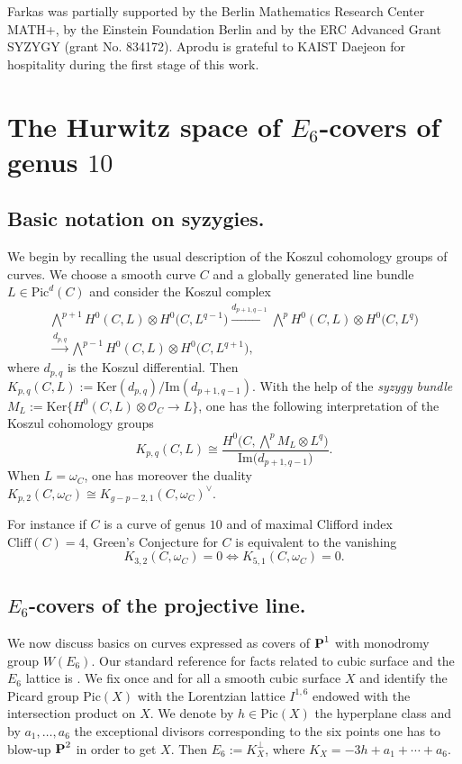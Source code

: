 \documentclass[11pt]{amsart}
\theoremstyle{definition}
\def\PP{{\textbf P}}
\begin{document}
\vskip 9pt

 Farkas was  partially supported by the Berlin Mathematics Research Center MATH+, by the Einstein Foundation Berlin and by the ERC Advanced Grant SYZYGY (grant No. 834172). Aprodu is grateful to KAIST Daejeon for hospitality during the first stage of this work.




\section{The Hurwitz space of $E_6$-covers of genus $10$}

\subsection{Basic notation on syzygies.} We begin by recalling the usual description of the Koszul cohomology groups of curves. We choose a smooth curve $C$ and a  globally generated line bundle $L\in \mbox{Pic}^d(C)$ and consider the Koszul complex
\begin{align*}
\bigwedge^{p+1} H^0(C,L)\otimes H^0\bigl(C, L^{q-1}\bigr)\stackrel{d_{p+1,q-1}}\longrightarrow \bigwedge^p H^0(C,L)\otimes H^0\bigl(C, L^q\bigr) \\
\stackrel{d_{p,q}}\longrightarrow \bigwedge^{p-1} H^0(C,L)\otimes H^0(C,  L^{q+1}\bigr),
\end{align*}
where $d_{p,q}$ is the Koszul differential. Then $K_{p,q}(C,L):=\mbox{Ker}(d_{p,q})/\mbox{Im}(d_{p+1,q-1})$. With the help of the \emph{syzygy bundle}
$M_L:=\mbox{Ker}\bigl\{H^0(C,L)\otimes \mathcal{O}_C\rightarrow L\bigr\}$,
one has the following  interpretation of the Koszul cohomology groups
\begin{equation}\label{eq:kernel_bundle}
 K_{p,q}(C, L) \cong \frac{H^0\bigl(C, \bigwedge^p M_L\otimes L^q \bigr)}{\mathrm{Im}\big(d_{p+1,q-1}\big)}.
\end{equation}
When $L=\omega_C$, one has moreover the duality $K_{p,2}(C,\omega_C)\cong K_{g-p-2,1}(C, \omega_C)^{\vee}$.

\vskip 4pt
For instance if $C$ is a curve of genus $10$ and of maximal Clifford index $\mbox{Cliff}(C)=4$, Green's Conjecture for $C$ is equivalent to the vanishing 
$$K_{3,2}(C,\omega_C)=0\Longleftrightarrow K_{5,1}(C,\omega_C)=0.$$

\subsection{$E_6$-covers of the projective line.} We now  discuss basics on curves expressed as covers of $\PP^1$ with monodromy group $W(E_6)$.  Our standard reference for facts related to cubic surface and the $E_6$ lattice is \cite[Chapters 8,9]{Dol}.
We fix once and for all a smooth cubic surface $X$ and identify the Picard group $\mbox{Pic}(X)$  with the Lorentzian lattice $I^{1,6}$ endowed with the intersection product on $X$. We denote by $h\in \mbox{Pic}(X)$ the hyperplane class and by $a_1, \ldots, a_6$ the exceptional divisors corresponding to the six points one has to blow-up $\PP^2$ in order  to get $X$. Then $E_6:=K_X^{\perp}$,  where $K_X=-3h+a_1+\cdots+a_6$. 
\end{document}
